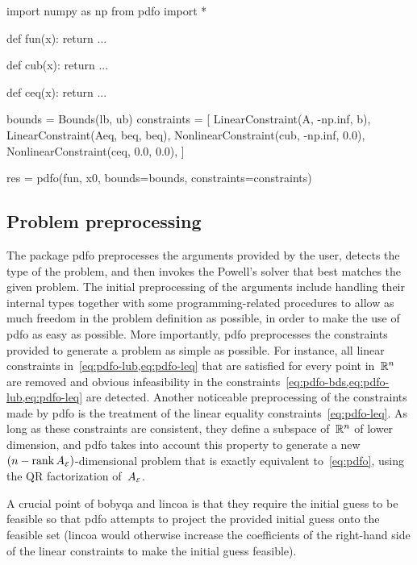 \begin{lstpython}[%
    caption=An elementary example of \gls{pdfo} in Python,
    label=lst:minimum-example-python,
]
    import numpy as np
    from pdfo import *

    def fun(x):
        return ...
    
    def cub(x):
        return ...
    
    def ceq(x):
        return ...
    
    bounds = Bounds(lb, ub)
    constraints = [
        LinearConstraint(A, -np.inf, b),
        LinearConstraint(Aeq, beq, beq),
        NonlinearConstraint(cub, -np.inf, 0.0),
        NonlinearConstraint(ceq, 0.0, 0.0),
    ]

    res = pdfo(fun, x0, bounds=bounds, constraints=constraints)
\end{lstpython}

\subsection{Problem preprocessing}

The package \gls{pdfo} preprocesses the arguments provided by the user, detects the type of the problem, and then invokes the Powell's solver that best matches the given problem.
The initial preprocessing of the arguments include handling their internal types together with some programming-related procedures to allow as much freedom in the problem definition as possible, in order to make the use of \gls{pdfo} as easy as possible.
More importantly, \gls{pdfo} preprocesses the constraints provided to generate a problem as simple as possible.
For instance, all linear constraints in~\cref{eq:pdfo-lub,eq:pdfo-leq} that are satisfied for every point in~$\mathbb{R}^n$ are removed and obvious infeasibility in the constraints~\cref{eq:pdfo-bds,eq:pdfo-lub,eq:pdfo-leq} are detected.
Another noticeable preprocessing of the constraints made by \gls{pdfo} is the treatment of the linear equality constraints~\cref{eq:pdfo-leq}.
As long as these constraints are consistent, they define a subspace of~$\mathbb{R}^n$ of lower dimension, and \gls{pdfo} takes into account this property to generate a new~$(n - \operatorname{rank} A_{\scriptscriptstyle\mathcal{E}})$-dimensional problem that is exactly equivalent to~\cref{eq:pdfo}, using the QR factorization of~$A_{\scriptscriptstyle\mathcal{E}}$.

A crucial point of \gls{bobyqa} and \gls{lincoa} is that they require the initial guess to be feasible so that \gls{pdfo} attempts to project the provided initial guess onto the feasible set (\gls{lincoa} would otherwise increase the coefficients of the right-hand side of the linear constraints to make the initial guess feasible).

